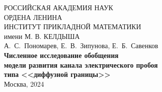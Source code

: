 \documentclass[a4paper,12pt]{article}
\theoremstyle{plain}
\theoremstyle{remark}
\newcommand{\PreprintTitleFormatted}{
	Численное исследование обобщения \\ модели развития канала электрического пробоя \\ типа <<диффузной границы>>
}
\newcommand{\PreprintAuthors}{%
	А.~С.~Пономарев, Е.~В.~Зипунова, Е.~Б.~Савенков%
}
\begin{document}
\begin{titlepage}

\begin{center}
	РОССИЙСКАЯ АКАДЕМИЯ НАУК \\
	ОРДЕНА ЛЕНИНА \\
	ИНСТИТУТ ПРИКЛАДНОЙ МАТЕМАТИКИ \\
	имени М. В. КЕЛДЫША \\

	\vspace*{60mm}
	{
		\Large{\PreprintAuthors} \\
	}
	\vspace*{20mm}
	{
		\large \textbf{\PreprintTitleFormatted} \\
	}
	\vspace*{110mm}
	\Large{Москва, 2024}
	\vspace*{-50mm}
\end{center}

\end{titlepage}

\setcounter{page}{2}

\thispagestyle{empty}
\end{document}

